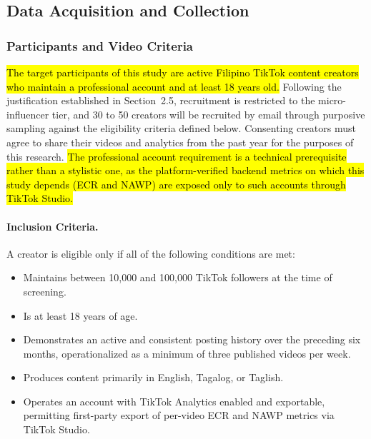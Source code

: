 \subsection{Data Acquisition and Collection}

\subsubsection{Participants and Video Criteria}
\label{sec:participants}

\hl{The target participants of this study are active Filipino TikTok content creators who maintain a professional account and at least 18 years old.} Following the justification established in Section~2.5, recruitment is restricted to the micro-influencer tier, and 30 to 50 creators will be recruited by email through purposive sampling against the eligibility criteria defined below. Consenting creators must agree to share their videos and analytics from the past year for the purposes of this research. \hl{The professional account requirement is a technical prerequisite rather than a stylistic one, as the platform-verified backend metrics on which this study depends (ECR and NAWP) are exposed only to such accounts through TikTok Studio.}

\paragraph{Inclusion Criteria.} A creator is eligible only if all of the following conditions are met:
\begin{itemize}
    \item Maintains between 10{,}000 and 100{,}000 TikTok followers at the time of screening.
    
    \item Is at least 18 years of age.

    \item Demonstrates an active and consistent posting history over the preceding six months, operationalized as a minimum of three published videos per week.

    \item Produces content primarily in English, Tagalog, or Taglish.

    \item Operates an account with TikTok Analytics enabled and exportable, permitting first-party export of per-video
    ECR and NAWP metrics via TikTok Studio.
\end{itemize}

